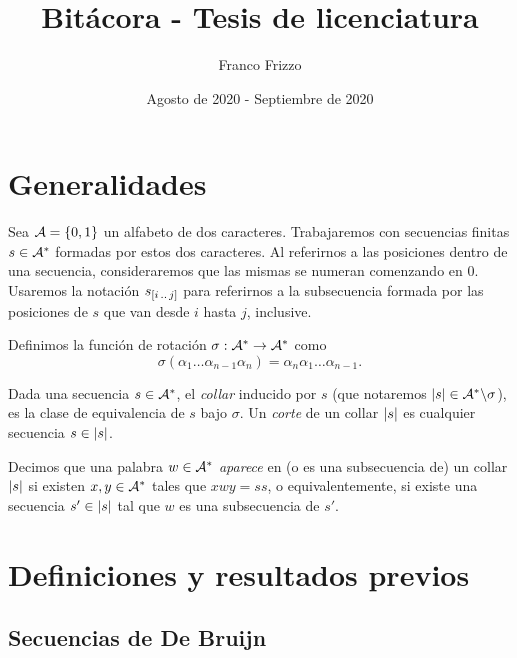 \documentclass[11pt]{article}
\newcommand\myauthor{Franco Frizzo}
\newcommand\mytitle{Bitácora - Tesis de licenciatura}
\newcommand\mydate{Agosto de 2020 - Septiembre de 2020}
\begin{document}
\title{\mytitle}
\author{\myauthor}
\date{\mydate}

\maketitle
\tableofcontents
\newpage

\section{Generalidades}

Sea $\mathcal{A} = \lbrace0, 1\rbrace$ un alfabeto de dos caracteres.
Trabajaremos con secuencias finitas $s \in \mathcal{A}^*$ formadas por estos dos
caracteres. Al referirnos a las posiciones dentro de una secuencia,
consideraremos que las mismas se numeran comenzando en $0$. Usaremos la
notación $s_{[i\,..\,j]}$ para referirnos a la subsecuencia formada por las
posiciones de $s$ que van desde $i$ hasta $j$, inclusive.

\begin{defi}
	Definimos la función de rotación $\sigma: \mathcal{A}^* \to \mathcal{A}^*$ como
	\[ \sigma(\alpha_1\dots\alpha_{n-1}\alpha_n) =
		\alpha_n\alpha_1\dots\alpha_{n-1}. \]
\end{defi}

\begin{defi}
	Dada una secuencia $s \in \mathcal{A}^*$, el \emph{collar} inducido por $s$
	(que notaremos $\left\vert s\right\vert \in \mathcal{A}^*\backslash\sigma$), es la clase de
	equivalencia de $s$ bajo $\sigma$. Un \emph{corte} de un collar $\left\vert s\right\vert$
	es cualquier secuencia $s \in \left\vert s\right\vert$.
\end{defi}

\begin{defi}

	Decimos que una palabra $w \in \mathcal{A}^*$ \emph{aparece} en (o es una
	subsecuencia de) un collar $\left\vert s\right\vert$ si existen $x, y \in \mathcal{A}^*$ tales
	que $xwy = ss$, o equivalentemente, si existe una secuencia $s' \in \left\vert s\right\vert$
	tal que $w$ es una subsecuencia de $s'$.
\end{defi}

\section{Definiciones y resultados previos}

\subsection{Secuencias de De Bruijn}
\end{document}
